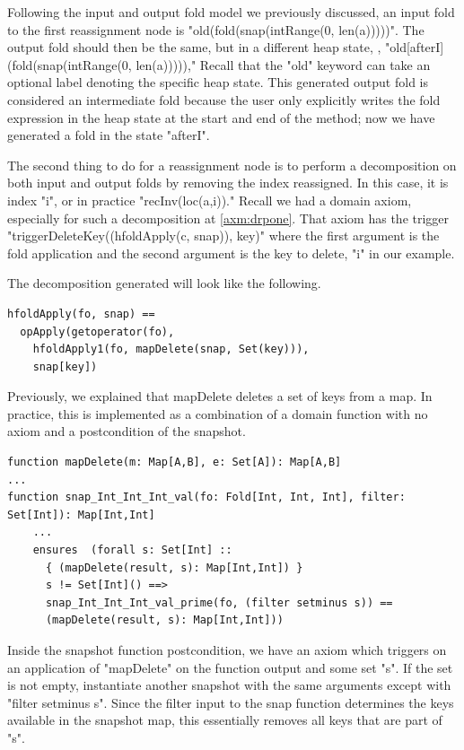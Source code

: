 \documentclass[msc,oneside]{ubcthesis}
\theoremstyle{definition}
\begin{document}
Following the input and output fold model we previously discussed, an input fold to the first reassignment node is "old(fold(snap(intRange(0, len(a)))))". The output fold should then be the same, but in a different heap state, \ie, "old[afterI](fold(snap(intRange(0, len(a))))),"
Recall that the "old" keyword can take an optional label denoting the specific heap state. This generated output fold is considered an intermediate fold because the user only explicitly writes the fold expression in the heap state at the start and end of the method; now we have generated a fold in the state "afterI".

The second thing to do for a reassignment node is to perform a decomposition on both input and output folds by removing the index reassigned. In this case, it is index "i", or in practice "recInv(loc(a,i))."  Recall we had a domain axiom, especially for such a decomposition at \cref{axm:drpone}. That axiom has the trigger "triggerDeleteKey((hfoldApply(c, snap)), key)" where the first argument is the fold application and the second argument is the key to delete, "i" in our example. 

The decomposition generated will look like the following.
\begin{lstlisting}[label=decomsin1,caption=Singleton Decomposition Example]
hfoldApply(fo, snap) == 
  opApply(getoperator(fo), 
    hfoldApply1(fo, mapDelete(snap, Set(key))), 
    snap[key])
\end{lstlisting}
Previously, we explained that mapDelete deletes a set of keys from a map. In practice, this is implemented as a combination of a domain function with no axiom and a postcondition of the snapshot.
\begin{lstlisting}[label=axm:mapDelete,caption=Encoding of mapDelete]
function mapDelete(m: Map[A,B], e: Set[A]): Map[A,B] 
...
function snap_Int_Int_Int_val(fo: Fold[Int, Int, Int], filter: Set[Int]): Map[Int,Int]
    ...
    ensures  (forall s: Set[Int] ::
      { (mapDelete(result, s): Map[Int,Int]) }
      s != Set[Int]() ==>
      snap_Int_Int_Int_val_prime(fo, (filter setminus s)) ==
      (mapDelete(result, s): Map[Int,Int]))
\end{lstlisting}

Inside the snapshot function postcondition, we have an axiom which triggers on an application of "mapDelete" on the function output and some set "s". If the set is not empty, instantiate another snapshot with the same arguments except with "filter setminus s". Since the filter input to the snap function determines the keys available in the snapshot map, this essentially removes all keys that are part of "s". 
\end{document}
